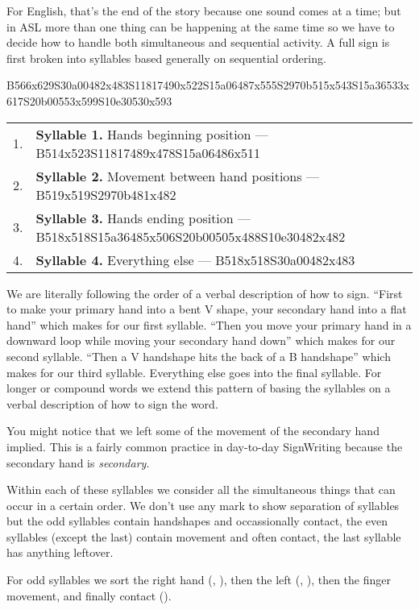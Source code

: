 \documentclass{article}
\begin{document}
For English, that's the end of the story because one sound comes at a time; but in ASL more than one thing can be happening at the same time so we have to decide how to handle both simultaneous and sequential activity.
A full sign is first broken into syllables based generally on sequential ordering.

B566x629S30a00482x483S11817490x522S15a06487x555S2970b515x543S15a36533x617S20b00553x599S10e30530x593 \raisebox{9mm}{becomes}
\begin{tabular}{p{1cm}p{11cm}}
\hfil 1.&\textbf{Syllable 1.}
Hands beginning position --- B514x523S11817489x478S15a06486x511\\
\hfil 2.&\textbf{Syllable 2.}
Movement between hand positions --- {B519x519S2970b481x482}\\
\hfil 3.&\textbf{Syllable 3.}
Hands ending position --- {B518x518S15a36485x506S20b00505x488S10e30482x482}\\
\hfil 4.&\textbf{Syllable 4.}
Everything else --- {B518x518S30a00482x483}\\
\end{tabular}

We are literally following the order of a verbal description of how to sign.
``First to make your primary hand into a bent V shape, your secondary hand into a flat hand'' which makes for our first syllable.
``Then you move your primary hand in a downward loop while moving your secondary hand down'' which makes for our second syllable.
``Then a V handshape hits the back of a B handshape'' which makes for our third syllable.
Everything else goes into the final syllable.
For longer or compound words we extend this pattern of basing the syllables on a verbal description of how to sign the word.

You might notice that we left some of the movement of the secondary hand implied.
This is a fairly common practice in day-to-day SignWriting because the secondary hand is \emph{secondary}.

Within each of these syllables we consider all the simultaneous things that can occur in a certain order.
We don't use any mark to show separation of syllables but the odd syllables contain handshapes and occassionally contact, the even syllables (except the last) contain movement and often contact, the last syllable has anything leftover.

For odd syllables we sort the right hand (, ), then the left (, ), then the finger movement, and finally contact ().
\end{document}
